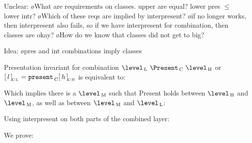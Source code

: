 Unclear:
\bl
\o What are requirements on classes. upper are equal? lower pres $\leq$ lower intr?
\o Which of these reqs are implied by interpresent?
\o if no longer works, then interpresent also fails, so if we have interpresent for combination, then classes are okay? 
\o How do we know that classes did not get to big?
\el

Idea:
\bl
\o pres and int combinations imply classes
\el


Presentation invariant for combination $\level\L~\Present\C~ \level\H$ or
 $[\,{l}\,]_{{\!_{CL}}} = {\tt present}_{\, \mathrm C} [\,{h}\,]_{{\!_{CH}}}$ is equivalent to:


Which implies there is a $\level\M$ such that {\sc Present} holds between $\level\H$ and $\level\M$, as well as between $\level\M$ and $\level\L$:




Using interpresent on both parts of the combined layer:

We prove:


